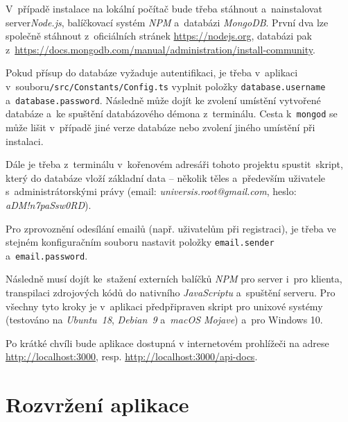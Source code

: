 \documentclass[a4paper,12pt]{article}
\def\code#1{\texttt{#1}}
\begin{document}
V~případě instalace na lokální počítač bude třeba stáhnout a~nainstalovat server\textit{Node.js}, balíčkovací systém \textit{NPM} a~databázi \textit{MongoDB}. První dva lze společně stáhnout z~oficiálních stránek \url{https://nodejs.org}, databázi pak z~\url{https://docs.mongodb.com/manual/administration/install-community}.

Pokud přísup do databáze vyžaduje autentifikaci, je třeba v~aplikaci v~souboru\break\code{/src/Constants/Config.ts} vyplnit položky \code{database.username} a~\code{database.password}. Následně může dojít ke zvolení umístění vytvořené databáze a~ke spuštění databázového démona z~terminálu. Cesta k~\code{mongod} se může lišit v~případě jiné verze databáze nebo zvolení jiného umístění při instalaci.



Dále je třeba z~terminálu v~kořenovém adresáři tohoto projektu spustit~skript, který do databáze vloží základní data -- několik těles a~především uživatele s~administrátorskými právy (email: \textit{universis.root@gmail.com}, heslo: \textit{aDM!n7paSsw0RD}).



Pro zprovoznění odesílání emailů (např. uživatelům při registraci), je třeba ve stejném konfiguračním souboru nastavit položky \code{email.sender} a~\code{email.password}.

Následně musí dojít ke~stažení externích balíčků \textit{NPM} pro server i~pro klienta, transpilaci zdrojových kódů do nativního \textit{JavaScriptu} a~spuštění serveru. Pro všechny tyto kroky je v~aplikaci předpřipraven skript pro unixové systémy (testováno na \textit{Ubuntu~18}, \textit{Debian~9} a~\textit{macOS Mojave}) a~pro Windows 10.



Po krátké chvíli bude aplikace dostupná v internetovém prohlížeči na adrese \url{http://localhost:3000}, resp. \url{http://localhost:3000/api-docs}.

\section{Rozvržení aplikace}
\end{document}
